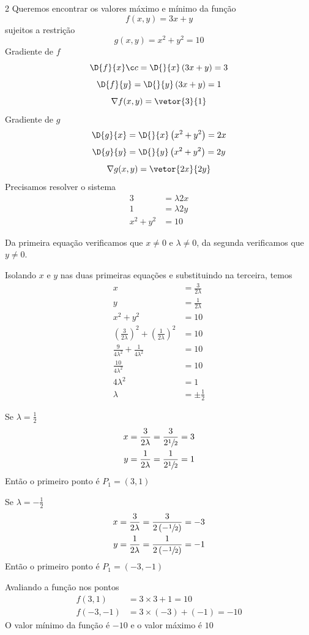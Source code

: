 \documentclass[a4paper,12pt,fleqn]{article}
\begin{document}
\begin{answer}
\setlength\columnsep{3em}
\begin{multicols*}{2}
  Queremos encontrar os valores máximo e mínimo da função
  \[
    f(x,y) = 3x + y
  \]
  sujeitos a restrição
  \[
    g(x, y) = x^2 + y^2 = 10
  \]
  Gradiente de $f$
  \[
    \D{f}{x}ç
    = \D{}{x}\left(3x + y\right)
    = 3
  \]
  \[
    \D{f}{y}
    = \D{}{y}\left(3x + y\right)
    = 1
  \]
  \[
    \nabla f(x, y) = \vetor{3}{1}
  \]
  Gradiente de $g$
  \[
    \D{g}{x}
    = \D{}{x}\left(x^2 + y^2\right)
    = 2x
  \]
  \[
    \D{g}{y}
    = \D{}{y}\left(x^2 + y^2\right)
    = 2y
  \]
  \[
    \nabla g(x, y) = \vetor{2x}{2y}
  \]
  Precisamos resolver o sistema
  \begin{align*}
    3 & = \lambda 2x \\
    1 & = \lambda 2y \\
    x^2 + y^2 & = 10
  \end{align*}

  Da primeira equação verificamos que $x\neq 0$ e $\lambda\neq 0$,
  da segunda verificamos que $y\neq 0$.

  Isolando $x$ e $y$ nas duas primeiras equações e substituindo na terceira, temos
  \begin{align*}
    x         & = \frac{3}{2\lambda} \\
    y         & = \frac{1}{2\lambda} \\
    x^2 + y^2 & = 10                 \\
    \left(\frac{3}{2\lambda}\right)^2 + \left(\frac{1}{2\lambda}\right)^2 & = 10 \\
    \frac{9}{4\lambda^2} + \frac{1}{4\lambda^2} & = 10 \\
    \frac{10}{4\lambda^2} & = 10 \\
    4\lambda^2 & = 1 \\
    \lambda & = \pm \frac{1}{2}
  \end{align*}

  Se \(\lambda = \frac{1}{2}\)
  \begin{align*}
    x & = \frac{3}{2\lambda} = \frac{3}{2\sfrac{1}{2}} = 3 \\
    y & = \frac{1}{2\lambda} = \frac{1}{2\sfrac{1}{2}} = 1
  \end{align*}
  Então o primeiro ponto é \(P_1 = \left(3, 1\right)\)

  Se \(\lambda = -\frac{1}{2}\)
  \begin{align*}
    x & = \frac{3}{2\lambda} = \frac{3}{2\left(-\sfrac{1}{2}\right)} = -3 \\
    y & = \frac{1}{2\lambda} = \frac{1}{2\left(-\sfrac{1}{2}\right)} = -1
  \end{align*}
  Então o primeiro ponto é \(P_1 = \left(-3, -1\right)\)

  Avaliando a função nos pontos
  \begin{align*}
    f(3, 1)   & = 3\times 3 + 1 = 10       \\
    f(-3, -1) & = 3\times(-3) + (-1) = -10
  \end{align*}
  O valor mínimo da função é $-10$ e o valor máximo é $10$
\end{multicols*}
\end{answer}

\end{document}
